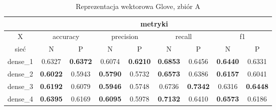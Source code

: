 \begin{table}[hp] \centering
    \caption{Reprezentacja wektorowa Glove, zbiór A}
    \label{tab:wyniki_glove_A}
    \begin{tabular} {|c|c|c|c|c|c|c|c|c| }    \hline
                 & \multicolumn{8}{c|}{metryki}                                                                                                                                                                                                                                                                                  \\ \hline
        X        & \multicolumn{2}{c|}{accuracy}       & \multicolumn{2}{c|}{precision}      & \multicolumn{2}{c|}{recall}         & \multicolumn{2}{c|}{f1}                                                                                                                                                                     \\ \hline
        sieć     & N                                   & P                                   & N                                   & P                                   & N                                   & P                                   & N                                   & P                                   \\ \hline
        dense\_1 & 0.6327                              & \textbf{0.6372}                     & 0.6074                              & \textbf{0.6210}                     & \textbf{0.6853}                     & 0.6456                              & \textbf{0.6440}                     & 0.6331                              \\ \hline
        dense\_2 & \textbf{0.6022}                     & 0.5943                              & \textbf{0.5790}                     & 0.5732                              & \textbf{0.6573}                     & 0.6386                              & \textbf{0.6157}                     & 0.6041                              \\ \hline
        dense\_3 & \textbf{0.6192}                     & 0.6079                              & \textbf{0.5946}                     & 0.5748                              & 0.6736                              & \textbf{0.7342}                     & 0.6316                              & \textbf{0.6448}                     \\ \hline
        dense\_4 & \textbf{0.6395}                     & 0.6169                              & \textbf{0.6095}                     & 0.5978                              & \textbf{0.7132}                     & 0.6410                              & \textbf{0.6573}                     & 0.6186                              \\ \hline

\end{tabular}
\end{table}
